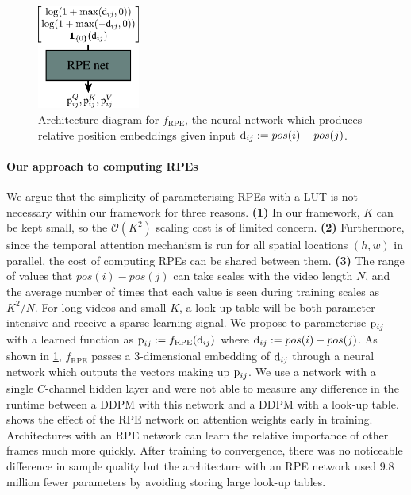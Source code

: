 \begin{figure}[t]
  \begin{center}
    \includegraphics[width=0.3\textwidth]{figs/fdm/rpe-net.pdf}
  \end{center}
  \caption{Architecture diagram for $f_\text{RPE}$, the neural network which produces relative position embeddings given input ${\textnormal{d}}_{ij} := pos(i)-pos(j)$.}
  \label{fig:fdm-rpe-net}
\end{figure}

\paragraph{Our approach to computing RPEs}
We argue that the simplicity of parameterising RPEs with a LUT is not necessary within our framework for three reasons. 
\textbf{(1)} In our framework, $K$ can be kept small, so the $\mathcal{O}(K^2)$ scaling cost is of limited concern. 
\textbf{(2)} Furthermore, since the temporal attention mechanism is run for all spatial locations $(h, w)$ in parallel, the cost of computing RPEs can be shared between them.
\textbf{(3)} The range of values that $pos(i)-pos(j)$ can take scales with the video length $N$, and the average number of times that each value is seen during training scales as ${K^2/N}$. For long videos and small $K$, a look-up table will be both parameter-intensive and receive a sparse learning signal. 
%
We propose to parameterise ${\textnormal{p}}_{ij}$ with a learned function as ${{\textnormal{p}}_{ij} := f_\text{RPE}({\textnormal{d}}_{ij})}$ where ${\textnormal{d}}_{ij} := pos(i)-pos(j)$. As shown in \cref{fig:fdm-rpe-net}, $f_\text{RPE}$ passes a 3-dimensional embedding of ${\textnormal{d}}_{ij}$ through a neural network which outputs the vectors making up ${\textnormal{p}}_{ij}$. We use a network with a single $C$-channel hidden layer and were not able to measure any difference in the runtime between a DDPM with this network and a DDPM with a look-up table.   shows the effect of the RPE network on attention weights early in training. Architectures with an RPE network can learn the relative importance of other frames much more quickly. After training to convergence, there was no noticeable difference in sample quality but the architecture with an RPE network used 9.8 million fewer parameters by avoiding storing large look-up tables.


